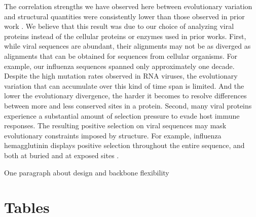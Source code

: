 \documentclass[12pt]{article}
\begin{document}
The correlation strengths we have observed here between evolutionary variation and structural quantities were consistently lower than those observed in prior work \citep{Jacksonetal2013,Yehetal2014}. We believe that this result was due to our choice of analyzing viral proteins instead of the cellular proteins or enzymes used in prior works. First, while viral sequences are abundant, their alignments may not be as diverged as alignments that can be obtained for sequences from cellular organisms. For example, our influenza sequences spanned only approximately one decade. Despite the high mutation rates observed in RNA viruses, the evolutionary variation that can accumulate over this kind of time span is limited. And the lower the evolutionary divergence, the harder it becomes to resolve differences between more and less conserved sites in a protein. Second, many viral proteins experience a substantial amount of selection pressure to evade host immune responses. The resulting positive selection on viral sequences may mask evolutionary constraints imposed by structure. For example, influenza hemagglutinin displays positive selection throughout the entire sequence, and both at buried and at exposed sites \citep{MeyerWilke2013,Meyeretal2013,Suzuki,Bush}.

{\color{blue}One paragraph about design and backbone flexibility}



\newpage

\section*{Tables}
\end{document}
